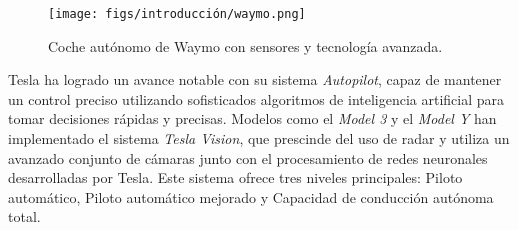 \begin{figure}[ht]
  \begin{center}
    \texttt{[image: figs/introducción/waymo.png]}
  \end{center}
  \caption{Coche autónomo de Waymo con sensores y tecnología avanzada.}
  \label{waymo}
\end{figure}

Tesla ha logrado un avance notable con su sistema \textit{Autopilot}, capaz de mantener un control preciso utilizando sofisticados algoritmos de inteligencia artificial para tomar decisiones rápidas y precisas. Modelos como el \textit{Model 3} y el \textit{Model Y} han implementado el sistema \textit{Tesla Vision}, que prescinde del uso de radar y utiliza un avanzado conjunto de cámaras junto con el procesamiento de redes neuronales desarrolladas por Tesla. Este sistema ofrece tres niveles principales: Piloto automático, Piloto automático mejorado y Capacidad de conducción autónoma total.

